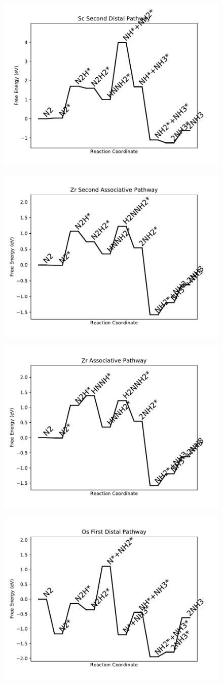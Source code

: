 \documentclass[journal=jacsat,manuscript=article]{achemso}
\begin{document}
\begin{figure}
\includegraphics[width=0.5\linewidth]{data/plots/Sc_distal_2.pdf}
\label{fig:Sc_distal_2}
\end{figure}

\begin{figure}
\includegraphics[width=0.5\linewidth]{data/plots/Zr_associative_2.pdf}
\label{fig:Zr_associative_2}
\end{figure}

\begin{figure}
\includegraphics[width=0.5\linewidth]{data/plots/Zr_associative.pdf}
\label{fig:Zr_associative}
\end{figure}

\begin{figure}
\includegraphics[width=0.5\linewidth]{data/plots/Os_distal_1.pdf}
\label{fig:Os_distal_1}
\end{figure}
\end{document}
